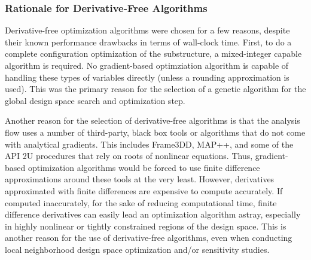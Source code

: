 \subsubsection{Rationale for Derivative-Free Algorithms}
Derivative-free optimization algorithms were chosen for a few reasons,
despite their known performance drawbacks in terms of wall-clock time.
First, to do a complete configuration optimization of the substructure,
a mixed-integer capable algorithm is required.  No gradient-based
optimziation algorithm is capable of handling these types of variables
directly (unless a rounding approximation is used).  This was the
primary reason for the selection of a genetic algorithm for the global
design space search and optimization step.

Another reason for the selection of derivative-free algorithms is that
the analysis flow uses a number of third-party, black box tools or
algorithms that do not come with analytical gradients.  This includes
Frame3DD, MAP++, and some of the API 2U procedures that rely on roots of
nonlinear equations.  Thus, gradient-based optimization algorithms would
be forced to use finite difference approximations around these tools at
the very least.  However, derivatives approximated with finite
differences are expensive to compute accurately.  If computed
inaccurately, for the sake of reducing computational time, finite
difference derivatives can easily lead an optimization algorithm astray,
especially in highly nonlinear or tightly constrained regions of the
design space.  This is another reason for the use of
derivative-free algorithms, even when conducting local neighborhood
design space optimization and/or sensitivity studies.

